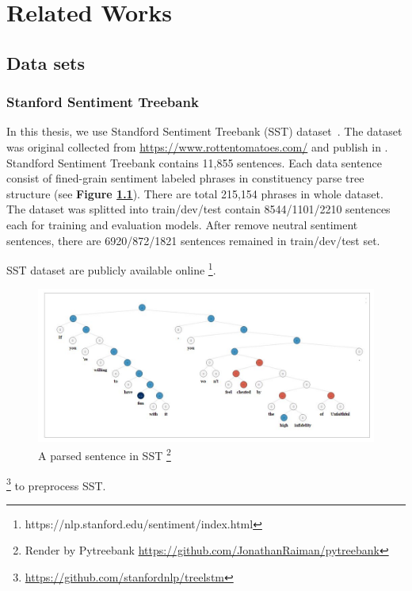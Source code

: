 \chapter{Related Works}

\section{Data sets}
\subsection{Stanford Sentiment Treebank} \label{sec:sst}
In this thesis, we use Standford Sentiment Treebank (SST) dataset~\cite{socher2013recursive}. The dataset was original collected from \url{https://www.rottentomatoes.com/} and publish in \cite{pang2002thumbs}. Standford Sentiment Treebank contains 11,855 sentences. Each data sentence consist of fined-grain sentiment labeled phrases in constituency parse tree structure (see \textbf{Figure \ref{fig:sst}}). There are total 215,154 phrases in whole dataset. 
The dataset was splitted into train/dev/test contain 8544/1101/2210 sentences each for training and evaluation models. After remove neutral sentiment sentences, there are 6920/872/1821 sentences remained in train/dev/test set.

SST dataset are publicly available online \footnote{https://nlp.stanford.edu/sentiment/index.html}.

\begin{figure}[H]
	\begin{minipage}{\textwidth}
		\centering
		\includegraphics[width=0.9\linewidth]{figure/sst}
		\caption[A parsed sentence in SST]{A parsed sentence in SST \footnote{Render by Pytreebank \url{https://github.com/JonathanRaiman/pytreebank}}}
		\label{fig:sst}
	\end{minipage}
\end{figure}

\footnote{\url{https://github.com/stanfordnlp/treelstm}} to preprocess SST.

